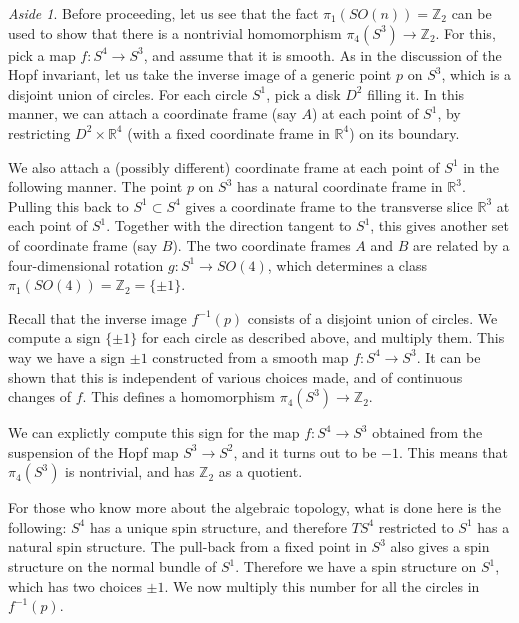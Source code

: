 \documentclass[12pt]{article}
\numberwithin{equation}{section}
\numberwithin{figure}{section}
\theoremstyle{remark}
\newtheorem{aside}[definition]{Aside}
\def\bR{\mathbb{R}}
\def\bZ{\mathbb{Z}}
\begin{document}
\begin{aside}
Before proceeding, let us see that the fact $\pi_1(SO(n))=\bZ_2$ 
can be used to show that there is a nontrivial homomorphism $\pi_4(S^3) \to \bZ_2$.
For this, pick a map $f:S^4\to S^3$, and assume that it is smooth.
As in the discussion of the Hopf invariant,
let us take the inverse image of a generic point $p$ on $S^3$, which is a disjoint union of circles.
For each circle $S^1$, pick a disk $D^2$ filling it.
In this manner, we can attach a coordinate frame (say $A$) at each point of $S^1$,
by restricting $D^2 \times \bR^4$ (with a fixed coordinate frame in $\bR^4$) on its boundary.

We also attach a (possibly different) coordinate frame at each point of $S^1$ in the following manner.
The point $p$ on $S^3$ has a natural coordinate frame in $\bR^3$.
Pulling this back to $S^1\subset S^4$ gives a coordinate frame to the transverse slice $\bR^3$ at each point of $S^1$.
Together with the direction  tangent to $S^1$, 
this gives another set of coordinate frame (say $B$).
The two coordinate frames $A$ and $B$ are related by a four-dimensional rotation $g:S^1\to SO(4)$,
which determines a class $\pi_1(SO(4))=\bZ_2=\{\pm1\}$.

Recall that the inverse image $f^{-1}(p)$ consists of a disjoint union of circles.
We compute a sign $\{\pm1\}$ for each circle as described above,
and multiply them.
This way we have a sign $\pm1$ constructed from a smooth map $f:S^4\to S^3$.
It can be shown that this is independent of various choices made,
and of continuous changes of $f$.
This defines a homomorphism $\pi_4(S^3)\to \bZ_2$.

We can explictly compute this sign for the map $f:S^4\to S^3$
obtained from the suspension of the Hopf map $S^3\to S^2$,
and it turns out to be $-1$.
This means that $\pi_4(S^3)$ is nontrivial, and has $\bZ_2$ as a quotient.

For those who know more about the algebraic topology,
what is done here is the following:
$S^4$ has a unique spin structure, and therefore
$TS^4$ restricted to $S^1$  has a natural spin structure.
The pull-back from a fixed point in $S^3$ also gives a spin structure on the normal bundle of $S^1$.
Therefore we have a spin structure on $S^1$,
which has two choices $\pm1$. 
We now multiply this number for all the circles in $f^{-1}(p)$.
\end{aside}
\end{document}
